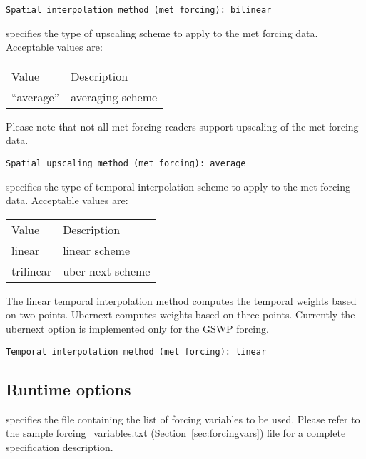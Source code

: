  \begin{Verbatim}[frame=single]
Spatial interpolation method (met forcing): bilinear
 \end{Verbatim}

 
 specifies the type of upscaling scheme to
 apply to the met forcing data.
 Acceptable values are:

 \begin{tabular}{ll}
 Value               & Description                              \\
 ``average''         & averaging scheme                         \\
 \end{tabular}

 Please note that not all met forcing readers support upscaling
 of the met forcing data.
 

 \begin{Verbatim}[frame=single]
Spatial upscaling method (met forcing): average
 \end{Verbatim}

 
 specifies the type of temporal interpolation scheme to 
 apply to the met forcing data.
 Acceptable values are:

 \begin{tabular}{ll}
 Value     & Description                      \\
 linear    & linear scheme                    \\
 trilinear & uber next scheme                 \\
 \end{tabular}

 The linear temporal interpolation method computes the temporal weights
 based on two points. Ubernext computes weights based on three points.
 Currently the ubernext option is implemented only for the GSWP forcing.
 

 \begin{Verbatim}[frame=single]
Temporal interpolation method (met forcing): linear
 \end{Verbatim}

 
 \subsection{Runtime options} \label{ssec:runtimeopts}
 

 
  specifies the file containing
 the list of forcing variables to be used. Please refer to the 
 sample forcing\_variables.txt (Section~\ref{sec:forcingvars})
 file for a complete specification description. 
 

